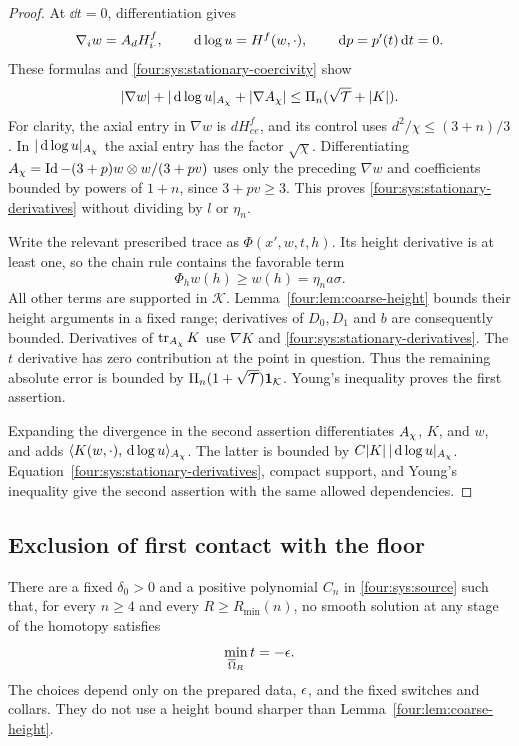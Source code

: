 \begin{proof}
At $\dd t=0$, differentiation gives
\[
 \nabla_iw=A_d H^f_{i\cdot},\qquad
 \,\mathrm d\log u=H^f(w,\cdot),\qquad \,\mathrm d p=p'(t)\,\mathrm d t=0.
\]
These formulas and \eqref{four:sys:stationary-coercivity} show
\begin{equation}\label{four:sys:stationary-derivatives}
 |\nabla w|+|\,\mathrm d\log u|_{A_\chi}+|\nabla A_\chi|
                  \le\Pi_n(\sqrt{\mathcal T}+|K|).
\end{equation}
For clarity, the axial entry in $\nabla w$ is $dH^f_{ee}$, and its
control uses $d^2/\chi\le(3+n)/3$.  In $|\,\mathrm d\log u|_{A_\chi}$
the axial entry has the factor $\sqrt\chi$.  Differentiating
$A_\chi=\operatorname{Id}-(3+p)w\otimes w/(3+pv)$ uses only the preceding
$\nabla w$ and coefficients bounded by powers of $1+n$, since
$3+pv\ge3$.  This proves \eqref{four:sys:stationary-derivatives} without
dividing by $l$ or $\eta_n$.

Write the relevant prescribed trace as $\Phi(x',w,t,h)$.  Its height
derivative is at least one, so the chain rule contains the favorable term
\[
 \Phi_h w(h)\ge w(h)=\eta_n a\sigma.
\]
All other terms are supported in $\mathcal K$.  Lemma~\ref{four:lem:coarse-height}
bounds their height arguments in a fixed range; derivatives of $D_0,D_1$
and $b$ are consequently bounded.  Derivatives of $\operatorname{tr}_{A_\chi}K$ use
$\nabla K$ and \eqref{four:sys:stationary-derivatives}.  The $t$ derivative
has zero contribution at the point in question.  Thus the remaining
absolute error is bounded by $\Pi_n(1+\sqrt{\mathcal T})\mathbf1_{\mathcal K}$.
Young's inequality proves the first assertion.

Expanding the divergence in the second assertion differentiates
$A_\chi$, $K$, and $w$, and adds
$\langle K(w,\cdot),\,\mathrm d\log u\rangle_{A_\chi}$.
The latter is bounded by $C|K|\,|\,\mathrm d\log u|_{A_\chi}$.
Equation~\eqref{four:sys:stationary-derivatives}, compact support, and Young's
inequality give the second assertion with the same allowed dependencies.
\end{proof}

\subsection{Exclusion of first contact with the floor}

\begin{proposition}\label{four:prop:floor-exclusion}
There are a fixed $\delta_0>0$ and a positive polynomial $C_n$ in
\eqref{four:sys:source} such that, for every $n\ge4$ and every
$R\ge R_{\min}(n)$, no smooth solution at any stage of the homotopy
satisfies
\[
 \min_{\overline\Omega_R}t=-\epsilon.
\]
The choices depend only on the prepared data, $\epsilon$, and the fixed
switches and collars.  They do not use a height bound sharper than
Lemma~\ref{four:lem:coarse-height}.
\end{proposition}

